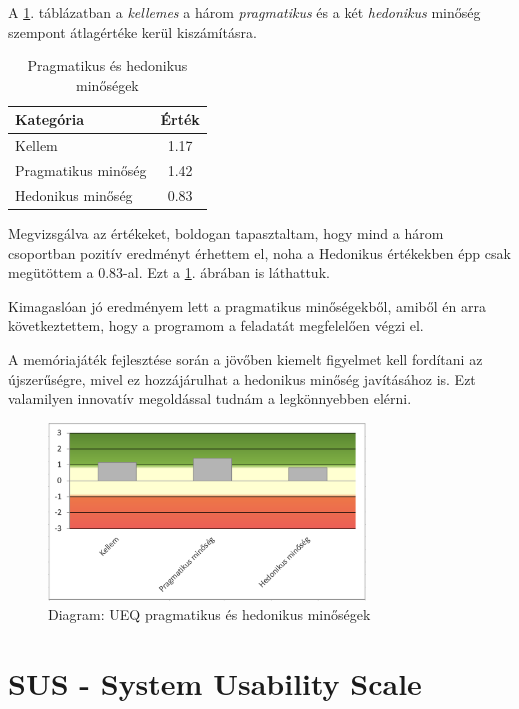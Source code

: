 A \ref{tab:pragmatic_hedonic_quality}. táblázatban a \textit{kellemes} a három \textit{pragmatikus} és a két \textit{hedonikus} minőség szempont átlagértéke kerül kiszámításra. 

\begin{table}[h]
    \centering
    \caption{Pragmatikus és hedonikus minőségek}
    \begin{tabular}{|l|c|}
        \hline
        \textbf{Kategória} & \textbf{Érték} \\ \hline
        Kellem & 1.17 \\ \hline
        Pragmatikus minőség & 1.42 \\ \hline
        Hedonikus minőség & 0.83 \\ \hline
    \end{tabular}
    \label{tab:pragmatic_hedonic_quality}
\end{table}

Megvizsgálva az értékeket, boldogan tapasztaltam, hogy mind a három csoportban pozitív eredményt érhettem el, noha a Hedonikus értékekben épp csak megütöttem a 0.83-al. Ezt a \ref{diag:pragmatic_hedonic}. ábrában is láthattuk.

Kimagaslóan jó eredményem lett a pragmatikus minőségekből, amiből én arra következtettem, hogy a programom a feladatát megfelelően végzi el. 

A memóriajáték fejlesztése során a jövőben kiemelt figyelmet kell fordítani az újszerűségre, mivel ez hozzájárulhat a hedonikus minőség javításához is. Ezt valamilyen innovatív megoldással tudnám a legkönnyebben elérni.

\begin{figure}[h]
    \center
    \includegraphics[width=0.75\textwidth]{img/UEQ_pragmatic_hedonic.png}
    \caption{Diagram: UEQ pragmatikus és hedonikus minőségek}
    \label{diag:pragmatic_hedonic}
\end{figure}

\section{SUS - System Usability Scale}

